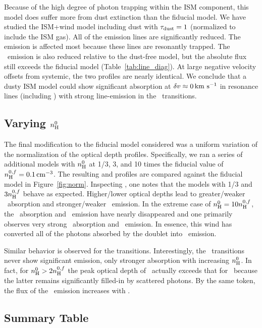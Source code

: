 \documentclass[12pt,preprint]{aastex}
\begin{document}
Because of the high degree of photon trapping within the ISM
component, this model does suffer more from dust extinction than the
fiducial model.  We have studied the ISM+wind model including dust
with $\tau_{\rm dust}=1$ (normalized to include the ISM gas).  All of the 
emission lines are significantly reduced.  The  emission is
affected most because these lines are resonantly trapped.  The \feiis\
emission is also reduced relative to the dust-free model, but the
absolute flux still exceeds the fiducial model
(Table~\ref{tab:line_diag}).  At large negative velocity offsets from
systemic, the two profiles are nearly identical.
We conclude that a dusty ISM model could show significant absorption
at $\delta v \approx 0 \, {\rm km~s^{-1}}$ in resonance lines (including
) with strong line-emission in the \feiis\
transitions.

\subsection{Varying $n_{\rm H}^0$}

The final modification to the fiducial model considered was %
a uniform variation of
the normalization of the optical depth profiles.
Specifically, we ran a series of additional models with $n_{\rm H}^0$ at
1/3, 3, and 10 times the fiducial value of $n_{\rm H}^{0,f} = 0.1 \, {\rm cm^{-3}}$.
The resulting  and \ion{Fe}{2} profiles are compared
against the fiducial model in Figure~\ref{fig:norm}.  Inspecting
\ion{Mg}{2}, one notes that the models with 1/3 and $3 n_{\rm H}^{0,f}$
behave as expected.  Higher/lower optical depths lead to
greater/weaker \mgiia\ absorption and stronger/weaker \mgiib\ emission.
In the extreme case of
$n_{\rm H}^0 = 10 n_{\rm H}^{0,f}$, the \mgiib\ absorption and \mgiia\
emission have nearly disappeared and one primarily observes very
strong \mgiia\ absorption and \mgiib\ emission.
In essence, this wind has converted all of the photons absorbed by the
\ion{Mg}{2} doublet into \mgiib\ emission.

Similar behavior is observed for the \ion{Fe}{2} transitions.
Interestingly, the \feiia\ transitions never show significant emission,
only stronger absorption with increasing $n_{\rm H}^0$.  In fact, for $n_{\rm H}^0
> 2 n_{\rm H}^{0,f}$ the peak optical depth of \feiia\ actually exceeds that
for \feiib\ because the latter remains significantly filled-in by
scattered photons.  By the same token, the flux of the \feiic\
emission increases with \nhn.

\subsection{Summary Table}
\end{document}
